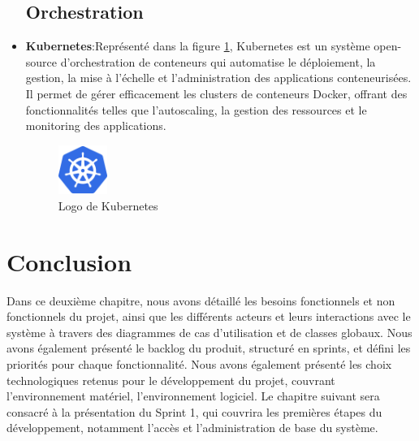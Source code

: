 \begin{itemize}
\subsection{Orchestration}
\item \textbf{Kubernetes}:Représenté dans la figure \ref{fig:kubernetes}, Kubernetes est un système open-source d'orchestration de conteneurs qui automatise le déploiement, la gestion, la mise à l’échelle et l’administration des applications conteneurisées. Il permet de gérer efficacement les clusters de conteneurs Docker, offrant des fonctionnalités telles que l’autoscaling, la gestion des ressources et le monitoring des applications.
 \begin{figure}[h]
    \centering
    \includegraphics[width=1.6cm]{images/kubernetes.png}
    \caption{Logo de Kubernetes}
    \label{fig:kubernetes}
\end{figure}
\end{itemize}
\section*{Conclusion}
Dans ce deuxième chapitre, nous avons détaillé les besoins fonctionnels et non fonctionnels du projet, ainsi que les différents acteurs et leurs interactions avec le système à travers des diagrammes de cas d'utilisation et de classes globaux. Nous avons également présenté le backlog du produit, structuré en sprints, et défini les priorités pour chaque fonctionnalité.
Nous avons également présenté les choix technologiques retenus pour le développement du projet, couvrant l'environnement matériel, l'environnement logiciel.
Le chapitre suivant sera consacré à la présentation du Sprint 1, qui couvrira les premières étapes du développement, notamment l'accès et l'administration de base du système.



